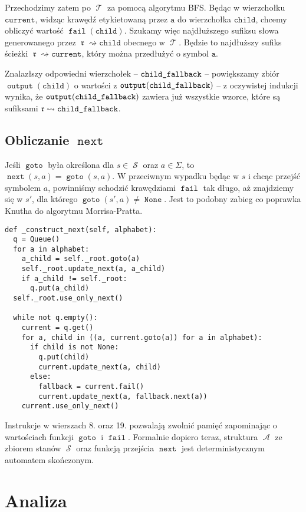 \documentclass{article}
\DeclareMathOperator{\rot}{\mathfrak{r}}
\DeclareMathOperator{\A}{\mathcal{A}}
\DeclareMathOperator{\states}{\mathcal{S}}
\DeclareMathOperator{\trie}{\mathcal{T}}
\DeclareMathOperator{\goto}{\texttt{goto}}
\DeclareMathOperator{\next}{\texttt{next}}
\DeclareMathOperator{\fail}{\texttt{fail}}
\DeclareMathOperator{\out}{\texttt{output}}
\DeclareMathOperator{\none}{\texttt{None}}
\begin{document}
Przechodzimy zatem po $\trie$ za pomocą algorytmu BFS. Będąc w wierzchołku $\texttt{current}$, widząc krawędź etykietowaną przez $\texttt{a}$ do wierzchołka $\texttt{child}$, chcemy obliczyć wartość $\fail(\texttt{child})$. Szukamy więc najdłuższego sufiksu słowa generowanego przez $\rot\rightsquigarrow\texttt{child}$ obecnego w $\trie$. Będzie to najdłuższy sufiks ścieżki $\rot\rightsquigarrow\texttt{current}$, który można przedłużyć o symbol $\texttt{a}$.

Znalazłszy odpowiedni wierzchołek -- $\texttt{child\textunderscore fallback}$ -- powiększamy zbiór $\out(\texttt{child})$ o wartości z  $\out(\texttt{child\textunderscore fallback})$ -- z oczywistej indukcji wynika, że $\out(\texttt{child\textunderscore fallback})$ zawiera już wszystkie wzorce, które są sufiksami $\rot\rightsquigarrow\texttt{child\textunderscore fallback}$.

\subsection{Obliczanie $\next$}

Jeśli $\goto$ była określona dla $s\in\states$ oraz $a\in\Sigma$, to $\next(s, a) = \goto(s, a)$. W przeciwnym wypadku będąc w $s$ i chcąc przejść symbolem $a$, powinniśmy schodzić krawędziami $\fail$ tak długo, aż znajdziemy się w $s'$, dla którego $\goto(s', a)\neq\none$. Jest to podobny zabieg co poprawka Knutha do algorytmu Morrisa-Pratta.
\begin{verbatim}
def _construct_next(self, alphabet):
  q = Queue()
  for a in alphabet:
    a_child = self._root.goto(a)
    self._root.update_next(a, a_child)
    if a_child != self._root:
      q.put(a_child)
  self._root.use_only_next()

  while not q.empty():
    current = q.get()
    for a, child in ((a, current.goto(a)) for a in alphabet):
      if child is not None:
        q.put(child)
        current.update_next(a, child)
      else:
        fallback = current.fail()
        current.update_next(a, fallback.next(a))
    current.use_only_next()
\end{verbatim}

Instrukcje w wierszach 8. oraz 19. pozwalają zwolnić pamięć zapominając o wartościach funkcji $\goto$ i $\fail$. Formalnie dopiero teraz, struktura $\A$ ze zbiorem stanów $\states$ oraz funkcją przejścia $\next$ jest deterministycznym automatem skończonym.

\section{Analiza}
\end{document}
